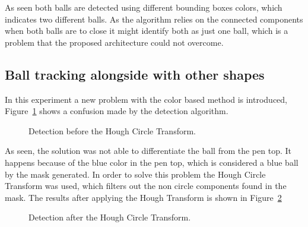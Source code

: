 \documentclass[10pt,twocolumn,letterpaper]{article}
\begin{document}
As seen both balls are detected using different bounding boxes colors, which indicates two different balls. As the algorithm relies on the connected components when both balls are to close it might identify both as just one ball, which is a problem that the proposed architecture could not overcome.

\subsection{Ball tracking alongside with other shapes}

In this experiment a new problem with the color based method is introduced, Figure~\ref{fig:not_hough} shows a confusion made by the detection algorithm.

\begin{figure}[!h]
\centering
\setlength{\fboxsep}{1pt}
\setlength{\fboxrule}{1pt}
\caption{Detection before the Hough Circle Transform.}\label{fig:not_hough}
\end{figure}

As seen, the solution was not able to differentiate the ball from the pen top. It happens because of the blue color in the pen top, which is considered a blue ball by the mask generated. In order to solve this problem the Hough Circle Transform was used, which filters out the non circle components found in the mask. The results after applying the Hough Transform is shown in Figure~\ref{fig:yes_hough}

\begin{figure}[!h]
\centering
\setlength{\fboxsep}{1pt}
\setlength{\fboxrule}{1pt}
\caption{Detection after the Hough Circle Transform.}\label{fig:yes_hough}
\end{figure}
\end{document}
